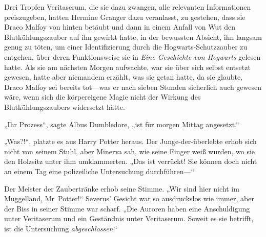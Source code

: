 Drei Tropfen Veritaserum, die sie dazu zwangen, alle relevanten Informationen preiszugeben, hatten Hermine Granger dazu veranlasst, zu gestehen, dass sie Draco Malfoy von hinten betäubt und dann in einem Anfall von Wut den Blutkühlungszauber auf ihn gewirkt hatte, in der bewussten Absicht, ihn langsam genug zu töten, um einer Identifizierung durch die Hogwarts-Schutzzauber zu entgehen, über deren Funktionsweise sie in \emph{Eine Geschichte von Hogwarts} gelesen hatte. Als sie am nächsten Morgen aufwachte, war sie über sich selbst entsetzt gewesen, hatte aber niemandem erzählt, was sie getan hatte, da sie glaubte, Draco Malfoy sei bereits tot—was er nach sieben Stunden sicherlich auch gewesen wäre, wenn sich die körpereigene Magie nicht der Wirkung des Blutkühlungszaubers widersetzt hätte.

„Ihr Prozess“, sagte Albus Dumbledore, „ist für morgen Mittag angesetzt.“

„Was?!“, platzte es aus Harry Potter heraus.
Der Junge-der-überlebte erhob sich nicht von seinem Stuhl, aber Minerva sah, wie seine Finger weiß wurden, wo sie den Holzsitz unter ihm umklammerten.
„Das ist verrückt! Sie können doch nicht an einem Tag eine polizeiliche Untersuchung durchführen—“

Der Meister der Zaubertränke erhob seine Stimme.
„Wir sind hier nicht im Muggelland, Mr~Potter!“
Severus’ Gesicht war so ausdruckslos wie immer, aber der Biss in seiner Stimme war scharf.
„Die Auroren haben eine Anschuldigung unter Veritaserum und ein Geständnis unter Veritaserum. Soweit es sie betrifft, ist die Untersuchung \emph{abgeschlossen}.“

